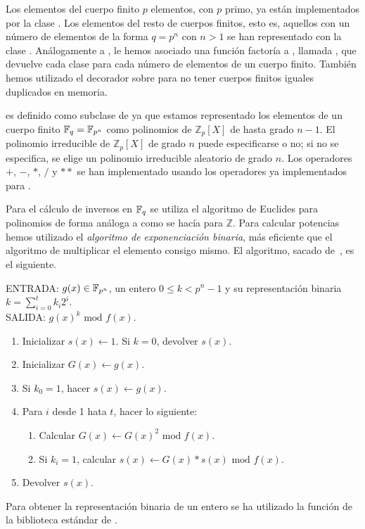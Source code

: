 Los elementos del cuerpo finito $p$ elementos, con $p$ primo, ya están implementados por la clase . Los elementos del resto de cuerpos finitos, esto es, aquellos con un número de elementos de la forma $q = p^n$ con $n > 1$ se han representado con la clase . Análogamente a , le hemos asociado una función factoría a , llamada , que devuelve cada clase para cada número de elementos de un cuerpo finito. También hemos utilizado el decorador  sobre  para no tener cuerpos finitos iguales duplicados en memoria.

 es definido como subclase de  ya que estamos representado los elementos de un cuerpo finito $\mathbb{F}_q = \mathbb{F}_{p^n}$ como polinomios de $\mathbb{Z}_p[X]$ de hasta grado $n-1$. El polinomio irreducible de $\mathbb{Z}_p[X]$ de grado $n$ puede especificarse o no; si no se especifica, se elige un polinomio irreducible aleatorio de grado $n$. Los operadores  $+$, $-$, $*$, $/$ y $**$ se han implementado usando los operadores ya implementados para .

Para el cálculo de inversos en $\mathbb{F}_q$ se utiliza el algoritmo de Euclides para polinomios de forma análoga a como se hacía para $\mathbb{Z}$. Para calcular potencias hemos utilizado el \emph{algoritmo de exponenciación binaria}, más eficiente que el algoritmo de multiplicar el elemento consigo mismo. El algoritmo, sacado de~\cite{Menezes:1996}, es el siguiente.
\begin{algoritmo2}
ENTRADA: $g(x) \in \mathbb{F}_{p^n}$, un entero $0 \le k < p^n - 1$ y su representación binaria $k = \sum_{i=0}^{t} k_i 2^i$. \\
SALIDA: $g(x)^k \textrm{ mod } f(x)$.
\begin{enumerate}
    \item Inicializar $s(x) \leftarrow 1$. Si $k = 0$, devolver $s(x)$.
    \item Inicializar $G(x) \leftarrow  g(x)$.
    \item Si $k_0 = 1$, hacer $s(x) \leftarrow  g(x)$.
    \item Para $i$ desde 1 hata $t$, hacer lo siguiente:
    \begin{enumerate}
        \item Calcular $G(x) \leftarrow  G(x)^2 \textrm{ mod } f(x)$.
        \item Si $k_i = 1$, calcular $s(x) \leftarrow G(x) * s(x) \textrm{ mod } f(x)$.
    \end{enumerate}
    \item Devolver $s(x)$.
\end{enumerate}
\end{algoritmo2}
Para obtener la representación binaria de un entero se ha utilizado la función de la biblioteca estándar de  .

